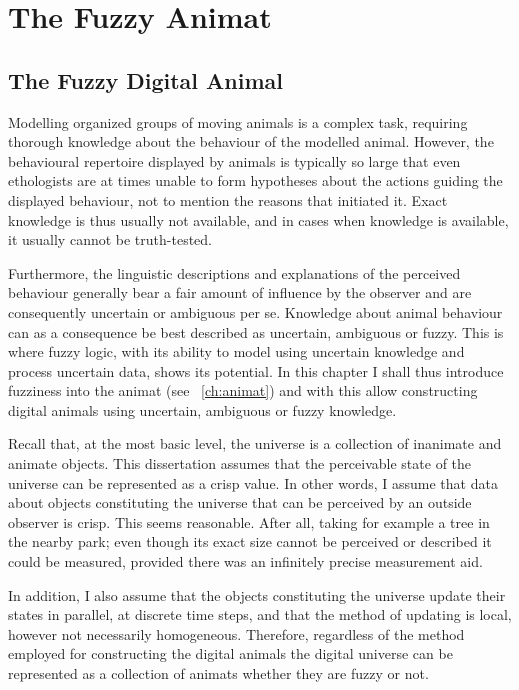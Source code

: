









\chapter{The Fuzzy Animat}
\label{ch:fuzzyAnimat}


\section{The Fuzzy Digital Animal}
\label{sec:fuzzyAnimat}
Modelling organized groups of moving animals is a complex task, requiring thorough knowledge about the behaviour of the modelled animal. However, the behavioural repertoire displayed by animals is typically so large that even ethologists are at times unable to form hypotheses about the actions guiding the displayed behaviour, not to mention the reasons that initiated it. Exact knowledge is thus usually not available, and in cases when knowledge is available, it usually cannot be truth-tested. 

Furthermore, the linguistic descriptions and explanations of the perceived behaviour generally bear a fair amount of influence by the observer and are consequently uncertain or ambiguous per se. Knowledge about animal behaviour can as a consequence be best described as uncertain, ambiguous or fuzzy. This is where fuzzy logic, with its ability to model using uncertain knowledge and process uncertain data, shows its potential. In this chapter I shall thus introduce fuzziness into the animat (see \chaptername~\ref{ch:animat}) and with this allow constructing digital animals using uncertain, ambiguous or fuzzy knowledge. 

Recall that, at the most basic level, the universe is a collection of inanimate and animate objects. This dissertation assumes that the perceivable state of the universe can be represented as a crisp value. In other words, I assume that data about objects constituting the universe that can be perceived by an outside observer is crisp. This seems reasonable. After all, taking for example a tree in the nearby park; even though its exact size cannot be perceived or described it could be measured, provided there was an infinitely precise measurement aid.

In addition, I also assume that the objects constituting the universe update their states in parallel, at discrete time steps, and that the method of updating is local, however not necessarily homogeneous. Therefore, regardless of the method employed for constructing the digital animals the digital universe can be represented as a collection of animats whether they are fuzzy or not.


